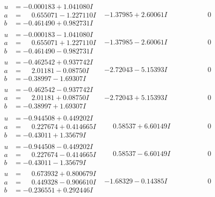 \documentclass[1p]{elsarticle_modified}
\theoremstyle{definition}
\begin{document}
$$\begin{array}{c|c|c}
\begin{aligned}
u &= -0.000183 + 1.041080 I \\
a &= \phantom{-}0.655071 - 1.227110 I \\
b &= -0.461490 + 0.982731 I\end{aligned}
 & -1.37985 + 2.60061 I & \phantom{-0.000000 } 0 \\ \hline\begin{aligned}
u &= -0.000183 - 1.041080 I \\
a &= \phantom{-}0.655071 + 1.227110 I \\
b &= -0.461490 - 0.982731 I\end{aligned}
 & -1.37985 - 2.60061 I & \phantom{-0.000000 } 0 \\ \hline\begin{aligned}
u &= -0.462542 + 0.937742 I \\
a &= \phantom{-}2.01181 - 0.08750 I \\
b &= -0.38997 - 1.69307 I\end{aligned}
 & -2.72043 - 5.15393 I & \phantom{-0.000000 } 0 \\ \hline\begin{aligned}
u &= -0.462542 - 0.937742 I \\
a &= \phantom{-}2.01181 + 0.08750 I \\
b &= -0.38997 + 1.69307 I\end{aligned}
 & -2.72043 + 5.15393 I & \phantom{-0.000000 } 0 \\ \hline\begin{aligned}
u &= -0.944508 + 0.449202 I \\
a &= \phantom{-}0.227674 + 0.414665 I \\
b &= -0.43011 + 1.35679 I\end{aligned}
 & \phantom{-}0.58537 + 6.60149 I & \phantom{-0.000000 } 0 \\ \hline\begin{aligned}
u &= -0.944508 - 0.449202 I \\
a &= \phantom{-}0.227674 - 0.414665 I \\
b &= -0.43011 - 1.35679 I\end{aligned}
 & \phantom{-}0.58537 - 6.60149 I & \phantom{-0.000000 } 0 \\ \hline\begin{aligned}
u &= \phantom{-}0.673932 + 0.800679 I \\
a &= \phantom{-}0.449328 - 0.906610 I \\
b &= -0.236551 + 0.292446 I\end{aligned}
 & -1.68329 - 0.14385 I & \phantom{-0.000000 } 0 \\ \hline\begin{aligned}

\end{aligned}
\end{array}$$
\end{document}

